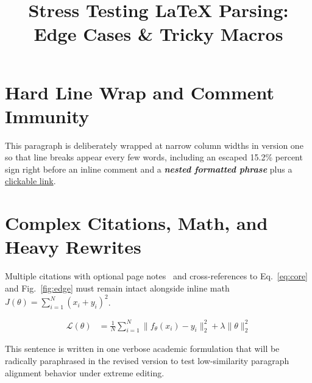 \documentclass{article}
\title{Stress Testing \textbf{LaTeX} Parsing: Edge Cases \& Tricky Macros}
\begin{document}
\section{Hard Line Wrap and Comment Immunity}
This paragraph is deliberately wrapped at narrow column widths in version one
so that line breaks appear every few words, including an escaped 15.2\% percent
sign right before an inline comment %
and a \textbf{\emph{nested formatted phrase}} plus a \href{https://example.org}{clickable link}.

\section{Complex Citations, Math, and Heavy Rewrites}
Multiple citations with optional page notes~\citep[see][p.~14]{alpha2023, beta2024} and cross-references to Eq.~\eqref{eq:core} and Fig.~\ref{fig:edge} must remain intact alongside inline math $J(\theta) = \sum_{i=1}^{N} (x_i + y_i)^2$.

\begin{align*}
\mathcal{L}(\theta) &= \frac{1}{N}\sum_{i=1}^N \|f_\theta(x_i) - y_i\|_2^2 + \lambda \|\theta\|_2^2
\end{align*}

This sentence is written in one verbose academic formulation that will be radically paraphrased in the revised version to test low-similarity paragraph alignment behavior under extreme editing.
\end{document}
